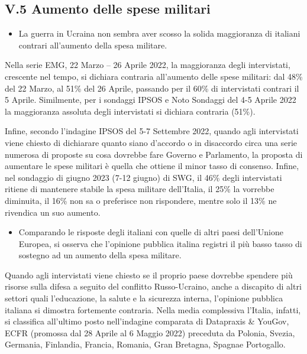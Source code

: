\documentclass[
  openany]{book}
\providecommand{\tightlist}{%
  \setlength{\itemsep}{0pt}\setlength{\parskip}{0pt}}
\begin{document}
\hypertarget{v.5-aumento-delle-spese-militari}{%
\subsection{V.5 Aumento delle spese militari}\label{v.5-aumento-delle-spese-militari}}

\begin{itemize}
\tightlist
\item
  La guerra in Ucraina non sembra aver scosso la solida maggioranza di italiani contrari all'aumento della spesa militare.
\end{itemize}

Nella serie EMG, 22 Marzo -- 26 Aprile 2022, la maggioranza degli intervistati, crescente nel tempo, si dichiara contraria all'aumento delle spese militari: dal 48\% del 22 Marzo, al 51\% del 26 Aprile, passando per il 60\% di intervistati contrari il 5 Aprile. Similmente, per i sondaggi IPSOS e Noto Sondaggi del 4-5 Aprile 2022 la maggioranza assoluta degli intervistati si dichiara contraria (51\%).

Infine, secondo l'indagine IPSOS del 5-7 Settembre 2022, quando agli intervistati viene chiesto di dichiarare quanto siano d'accordo o in disaccordo circa una serie numerosa di proposte su cosa dovrebbe fare Governo e Parlamento, la proposta di aumentare le spese militari è quella che ottiene il minor tasso di consenso. Infine, nel sondaggio di giugno 2023 (7-12 giugno) di SWG, il 46\% degli intervistati ritiene di mantenere stabile la spesa militare dell'Italia, il 25\% la vorrebbe diminuita, il 16\% non sa o preferisce non rispondere, mentre solo il 13\% ne rivendica un suo aumento.

\begin{itemize}
\tightlist
\item
  Comparando le risposte degli italiani con quelle di altri paesi dell'Unione Europea, si osserva che l'opinione pubblica italina registri il più basso tasso di sostegno ad un aumento della spesa militare.
\end{itemize}

Quando agli intervistati viene chiesto se il proprio paese dovrebbe spendere più risorse sulla difesa a seguito del conflitto Russo-Ucraino, anche a discapito di altri settori quali l'educazione, la salute e la sicurezza interna, l'opinione pubblica italiana si dimostra fortemente contraria. Nella media complessiva l'Italia, infatti, si classifica all'ultimo posto nell'indagine comparata di Datapraxis \& YouGov, ECFR (promossa dal 28 Aprile al 6 Maggio 2022) preceduta da Polonia, Svezia, Germania, Finlandia, Francia, Romania, Gran Bretagna, Spagnae Portogallo.
\end{document}
